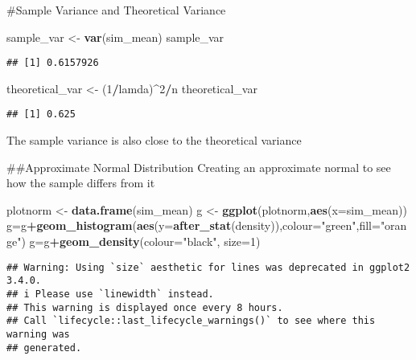 \documentclass[
]{article}
\newenvironment{Shaded}{\begin{snugshade}}{\end{snugshade}}
\newcommand{\AttributeTok}[1]{\textcolor[rgb]{0.13,0.29,0.53}{#1}}
\newcommand{\DecValTok}[1]{\textcolor[rgb]{0.00,0.00,0.81}{#1}}
\newcommand{\FunctionTok}[1]{\textcolor[rgb]{0.13,0.29,0.53}{\textbf{#1}}}
\newcommand{\NormalTok}[1]{#1}
\newcommand{\OtherTok}[1]{\textcolor[rgb]{0.56,0.35,0.01}{#1}}
\newcommand{\SpecialCharTok}[1]{\textcolor[rgb]{0.81,0.36,0.00}{\textbf{#1}}}
\newcommand{\StringTok}[1]{\textcolor[rgb]{0.31,0.60,0.02}{#1}}
\begin{document}
\#Sample Variance and Theoretical Variance

\begin{Shaded}
\begin{Highlighting}[]
\NormalTok{sample\_var }\OtherTok{\textless{}{-}} \FunctionTok{var}\NormalTok{(sim\_mean)}
\NormalTok{sample\_var}
\end{Highlighting}
\end{Shaded}

\begin{verbatim}
## [1] 0.6157926
\end{verbatim}

\begin{Shaded}
\begin{Highlighting}[]
\NormalTok{theoretical\_var }\OtherTok{\textless{}{-}}\NormalTok{ (}\DecValTok{1}\SpecialCharTok{/}\NormalTok{lamda)}\SpecialCharTok{\^{}}\DecValTok{2}\SpecialCharTok{/}\NormalTok{n}
\NormalTok{theoretical\_var}
\end{Highlighting}
\end{Shaded}

\begin{verbatim}
## [1] 0.625
\end{verbatim}

The sample variance is also close to the theoretical variance

\#\#Approximate Normal Distribution Creating an approximate normal to
see how the sample differs from it

\begin{Shaded}
\begin{Highlighting}[]
\NormalTok{plotnorm }\OtherTok{\textless{}{-}} \FunctionTok{data.frame}\NormalTok{(sim\_mean)}
\NormalTok{g }\OtherTok{\textless{}{-}} \FunctionTok{ggplot}\NormalTok{(plotnorm,}\FunctionTok{aes}\NormalTok{(}\AttributeTok{x=}\NormalTok{sim\_mean))}
\NormalTok{g}\OtherTok{=}\NormalTok{g}\SpecialCharTok{+}\FunctionTok{geom\_histogram}\NormalTok{(}\FunctionTok{aes}\NormalTok{(}\AttributeTok{y=}\FunctionTok{after\_stat}\NormalTok{(density)),}\AttributeTok{colour=}\StringTok{"green"}\NormalTok{,}\AttributeTok{fill=}\StringTok{"orange"}\NormalTok{)}
\NormalTok{g}\OtherTok{=}\NormalTok{g}\SpecialCharTok{+}\FunctionTok{geom\_density}\NormalTok{(}\AttributeTok{colour=}\StringTok{"black"}\NormalTok{, }\AttributeTok{size=}\DecValTok{1}\NormalTok{)}
\end{Highlighting}
\end{Shaded}

\begin{verbatim}
## Warning: Using `size` aesthetic for lines was deprecated in ggplot2 3.4.0.
## i Please use `linewidth` instead.
## This warning is displayed once every 8 hours.
## Call `lifecycle::last_lifecycle_warnings()` to see where this warning was
## generated.
\end{verbatim}
\end{document}
